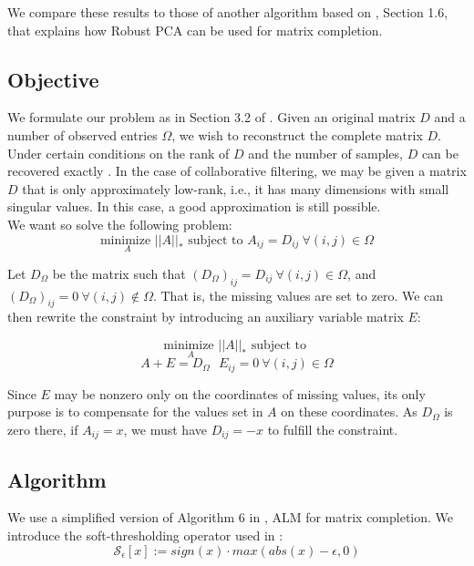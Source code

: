 \documentclass[10pt,conference,compsocconf]{IEEEtran}
\begin{document}
We compare these results to those of another algorithm based on \cite{rpcapaper},
Section 1.6, that explains how Robust PCA can be used for matrix completion. \\

\subsection{Objective}

We formulate our problem as in Section 3.2 of \cite{almpaper}. Given an original matrix $D$ and
a number of observed entries $\Omega$, we wish to reconstruct the complete matrix $D$. Under certain
conditions on the rank of $D$ and the number of samples, $D$ can be recovered exactly \cite{exactpaper}. 
In the case of collaborative filtering, we may be given a matrix $D$ that is only
approximately low-rank, i.e., it has many dimensions with small singular values. In this case, a good approximation
is still possible. \\

We want so solve the following problem: 
$$ \underset{A}{\text{minimize }} ||A||_* \text{ subject to  } A_{ij} = D_{ij} \ \forall(i, j) \in \Omega$$

Let $D_{\Omega}$ be the matrix such that $(D_{\Omega})_{ij} = D_{ij} \ \forall(i, j) \in \Omega$, and $(D_{\Omega})_{ij} = 0 \ \forall(i, j) \notin \Omega$. That is, the missing values are set to zero. We can then rewrite the constraint by introducing an auxiliary variable matrix $E$:

$$ \underset{A}{\text{minimize }} ||A||_* \text{ subject to  }$$ 
$$A + E = D_{\Omega} \ \ \ E_{ij} = 0 \ \forall(i, j) \in \Omega$$

Since $E$ may be nonzero only on the coordinates of missing values, its only purpose is to compensate for the values set in $A$ on these coordinates. As $D_{\Omega}$ is zero there, if $A_{ij} = x$, we must have $D_{ij} = -x$ to fulfill the constraint. \\

\subsection{Algorithm}

We use a simplified version of Algorithm 6 in \cite{almpaper}, ALM for matrix completion. We introduce the soft-thresholding operator used in \cite{almpaper}: \\

$$\mathcal{S}_{\epsilon}[x] := sign(x) \cdot max(abs(x) - \epsilon, 0)$$
\end{document}
